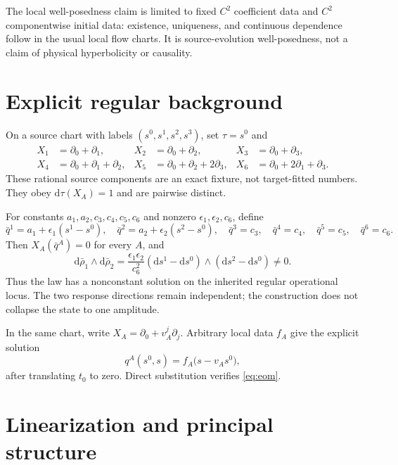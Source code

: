\documentclass[11pt]{article}
\newcommand{\dd}{\mathrm d}
\begin{document}
The local well-posedness claim is limited to fixed $C^2$ coefficient data and
$C^2$ componentwise initial data: existence, uniqueness, and continuous
dependence follow in the usual local flow charts.  It is source-evolution
well-posedness, not a claim of physical hyperbolicity or causality.

\section{Explicit regular background}

On a source chart with labels $(s^0,s^1,s^2,s^3)$, set $\tau=s^0$ and
\begin{align}
 X_1&=\partial_0+\partial_1,&
 X_2&=\partial_0+\partial_2,&
 X_3&=\partial_0+\partial_3,\nonumber\\
 X_4&=\partial_0+\partial_1+\partial_2,&
 X_5&=\partial_0+\partial_2+2\partial_3,&
 X_6&=\partial_0+2\partial_1+\partial_3.
 \label{eq:witnessvectors}
\end{align}
These rational source components are an exact fixture, not target-fitted
numbers.  They obey $\dd\tau(X_A)=1$ and are pairwise distinct.

For constants $a_1,a_2,c_3,c_4,c_5,c_6$ and nonzero
$\epsilon_1,\epsilon_2,c_6$, define
\begin{equation}
 \bar q^1=a_1+\epsilon_1(s^1-s^0),\quad
 \bar q^2=a_2+\epsilon_2(s^2-s^0),\quad
 \bar q^3=c_3,\quad \bar q^4=c_4,\quad
 \bar q^5=c_5,\quad \bar q^6=c_6.
 \label{eq:background}
\end{equation}
Then $X_A(\bar q^A)=0$ for every $A$, and
\begin{equation}
 \dd\bar\rho_1\wedge\dd\bar\rho_2
 =\frac{\epsilon_1\epsilon_2}{c_6^2}
  (\dd s^1-\dd s^0)\wedge(\dd s^2-\dd s^0)\ne0.
 \label{eq:rankwitness}
\end{equation}
Thus the law has a nonconstant solution on the inherited regular operational
locus.  The two response directions remain independent; the construction does
not collapse the state to one amplitude.

In the same chart, write $X_A=\partial_0+v_A^j\partial_j$.  Arbitrary local
data $f_A$ give the explicit solution
\begin{equation}
  q^A(s^0,s)=f_A\bigl(s-v_A s^0\bigr),
  \label{eq:explicit}
\end{equation}
after translating $t_0$ to zero.  Direct substitution verifies
\eqref{eq:eom}.

\section{Linearization and principal structure}
\end{document}
